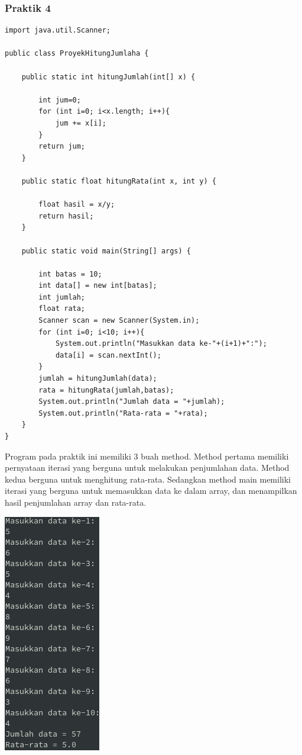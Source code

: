 \documentclass[a4paper,12pt]{article}
\begin{document}
\subsubsection{Praktik 4}
\begin{lstlisting}
import java.util.Scanner;

public class ProyekHitungJumlaha {

    public static int hitungJumlah(int[] x) {
        
        int jum=0;
        for (int i=0; i<x.length; i++){
            jum += x[i];
        }
        return jum;
    }

    public static float hitungRata(int x, int y) {

        float hasil = x/y;
        return hasil;
    }

    public static void main(String[] args) {

        int batas = 10;
        int data[] = new int[batas];
        int jumlah;
        float rata;
        Scanner scan = new Scanner(System.in);
        for (int i=0; i<10; i++){
            System.out.println("Masukkan data ke-"+(i+1)+":");
            data[i] = scan.nextInt();
        }
        jumlah = hitungJumlah(data);
        rata = hitungRata(jumlah,batas);
        System.out.println("Jumlah data = "+jumlah);
        System.out.println("Rata-rata = "+rata);
    }
}
\end{lstlisting}
Program pada praktik ini memiliki 3 buah method. Method pertama memiliki pernyataan iterasi yang berguna untuk
melakukan penjumlahan data. Method kedua berguna untuk menghitung rata-rata. Sedangkan method main memiliki iterasi
yang berguna untuk memasukkan data ke dalam array, dan menampilkan hasil penjumlahan array dan rata-rata.

\begin{center}
    \includegraphics[scale=1]{4.png} 
\end{center}
\end{document}
